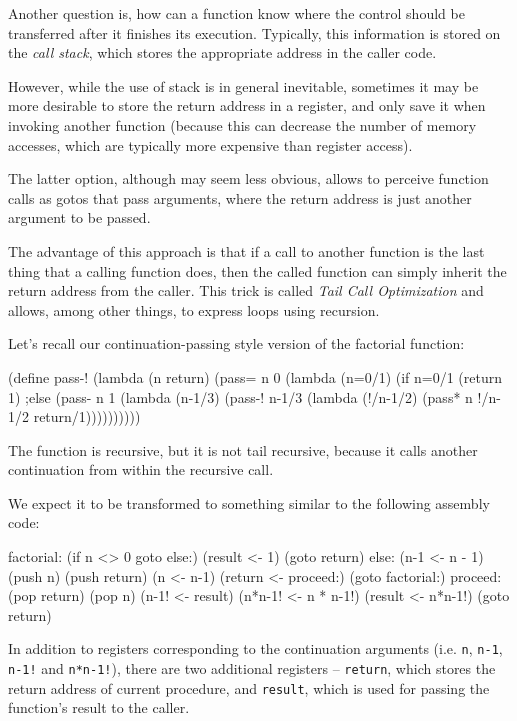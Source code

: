 Another question is, how can a function know where the
control should be transferred after it finishes its execution.
Typically, this information is stored on the \textit{call stack},
which stores the appropriate address in the caller code.

However, while the use of stack is in general inevitable,
sometimes it may be more desirable to store the return address
in a register, and only save it when invoking another function
(because this can decrease the number of memory accesses, which
are typically more expensive than register access).

The latter option, although may seem less obvious, allows to
perceive function calls as gotos that pass arguments\cite{SussmanSteele1976},
where the return address is just another argument to be passed.

The advantage of this approach is that if a call to another
function is the last thing that a calling function does, then
the called function can simply inherit the return address
from the caller. This trick is called \textit{Tail Call
  Optimization} and allows, among other things, to 
express loops using recursion.

Let's recall our continuation-passing style version of the factorial
function:

\begin{Snippet}
(define pass-!
  (lambda (n return)
    (pass= n 0
      (lambda (n=0/1)
        (if n=0/1
           (return 1)
        ;else
           (pass- n 1
             (lambda (n-1/3)
               (pass-! n-1/3
                 (lambda (!/n-1/2)
                   (pass* n !/n-1/2 return/1))))))))))
\end{Snippet}

The function is recursive, but it is not tail recursive,
because it calls another continuation from within the recursive
call.

We expect it to be transformed to something similar to the following
assembly code:

\begin{Snippet}
  factorial:
    (if n <> 0 goto else:)
    (result <- 1)
    (goto return)
  else:
    (n-1 <- n - 1)
    (push n)
    (push return)
    (n <- n-1)
    (return <- proceed:)
    (goto factorial:)
  proceed:
    (pop return)
    (pop n)
    (n-1! <- result)
    (n*n-1! <- n * n-1!)
    (result <- n*n-1!)
    (goto return)
\end{Snippet}

In addition to registers corresponding to the continuation arguments
(i.e. \texttt{n}, \texttt{n-1}, \texttt{n-1!} and \texttt{n*n-1!}),
there are two additional registers -- \texttt{return}, which stores
the return address of current procedure, and \texttt{result}, which
is used for passing the function's result to the caller.

